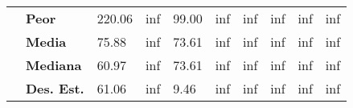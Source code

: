 \documentclass{article}
\begin{document}
\begin{table}[h!]
\begin{tabular}{|c|l|l|l|l|l|l|l|l|l|}
                                                   & \textbf{Peor}                             & 220.06                            & inf                               & 99.00                             & inf                               & inf                               & inf                               & inf                               & inf                               \\ \cline{2-10} 
                                                   & \textbf{Media}                            & 75.88                             & inf                               & 73.61                             & inf                               & inf                               & inf                               & inf                               & inf                               \\ \cline{2-10} 
                                                   & \textbf{Mediana}                          & 60.97                             & inf                               & 73.61                             & inf                               & inf                               & inf                               & inf                               & inf                               \\ \cline{2-10} 
                                                   & \textbf{Des. Est.}                        & 61.06                             & inf                               & 9.46                              & inf                               & inf                               & inf                               & inf                               & inf                               \\ \hline
\end{tabular}
\end{table}
\end{document}
